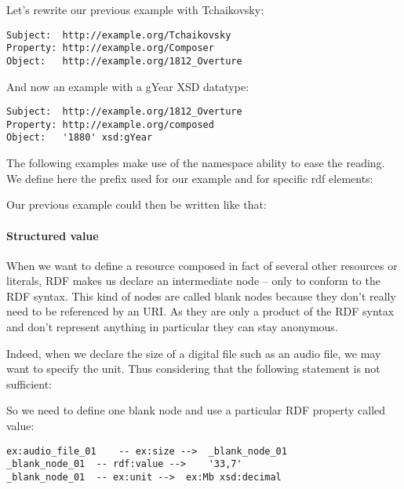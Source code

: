 Let's rewrite our previous example with Tchaikovsky:
\begin{Verbatim}[fontsize=\small,formatcom=\color{black!70}]
Subject:  http://example.org/Tchaikovsky
Property: http://example.org/Composer
Object:   http://example.org/1812_Overture
\end{Verbatim}

And now an example with a gYear XSD datatype:
\begin{Verbatim}[fontsize=\small,formatcom=\color{black!70}]
Subject:  http://example.org/1812_Overture
Property: http://example.org/composed
Object:   '1880' xsd:gYear
\end{Verbatim}
The following examples make use of the namespace ability to ease the reading. We define here the prefix used for our example and for specific rdf elements:
\begin{liste}
	\item {}
	\item {}
\end{liste}
Our previous example could then be written like that:


\paragraph{Structured value}
When we want to define a resource composed in fact of several other resources or literals, 
RDF makes us declare an intermediate node – only to conform to the RDF syntax. 
This kind of nodes are called blank nodes because they don't really need to be referenced by an URI. 
As they are only a product of the RDF syntax and don't represent anything in particular they can stay anonymous.

Indeed, when we declare the size of a digital file such as an audio file, we may want to specify the unit. 
Thus considering that the following statement is not sufficient:

So we need to define one blank node and use a particular RDF property called value:
\begin{Verbatim}[fontsize=\small,formatcom=\color{black!70}]
ex:audio_file_01 	-- ex:size -->	_blank_node_01
_blank_node_01	-- rdf:value -->	'33,7'
_blank_node_01	-- ex:unit -->	ex:Mb xsd:decimal
\end{Verbatim}

